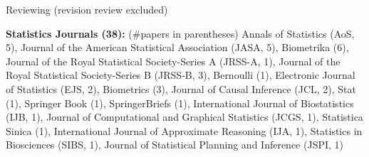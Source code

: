 \documentclass{article}
\begin{document}
\vspace{5mm}











\vspace{5mm}
\begin{large}
\noindent Reviewing (revision review excluded)
\end{large}

\vspace{2mm}
\noindent \textbf{Statistics Journals (38): }(\#papers in parentheses) Annals of Statistics (AoS, 5), Journal of the American Statistical Association (JASA, 5), Biometrika (6), Journal of the Royal Statistical Society-Series A (JRSS-A, 1), Journal of the Royal Statistical Society-Series B (JRSS-B, 3), Bernoulli (1), Electronic Journal of Statistics (EJS, 2), Biometrics (3), Journal of Causal Inference (JCL, 2), Stat (1), Springer Book (1), SpringerBriefs (1), International Journal of Biostatistics (IJB, 1), Journal of Computational and Graphical Statistics (JCGS, 1), Statistica Sinica (1), International Journal of Approximate Reasoning (IJA, 1), Statistics in Biosciences (SIBS, 1), Journal of Statistical Planning and Inference (JSPI, 1)
\end{document}
